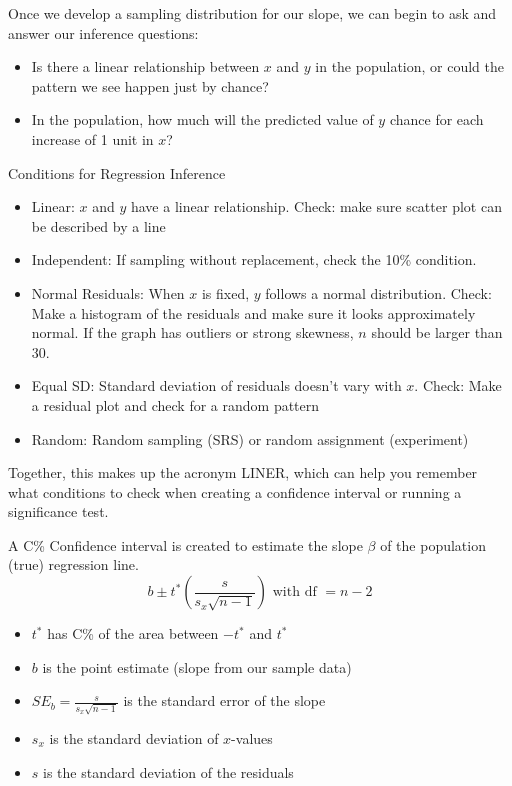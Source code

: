\documentclass[../stats.tex]{subfiles}
\begin{document}
Once we develop a sampling distribution for our slope, we can begin to ask and answer our inference questions:
\begin{itemize}
    \item Is there a linear relationship between $x$ and $y$ in the population, or could the pattern we see happen just by chance?
    \item In the population, how much will the predicted value of $y$ chance for each increase of 1 unit in $x$?
\end{itemize}

Conditions for Regression Inference 
\begin{itemize}
    \item Linear: $x$ and $y$ have a linear relationship. Check: make sure scatter plot can be described by a line 
    \item Independent: If sampling without replacement, check the 10\% condition.
    \item Normal Residuals: When $x$ is fixed, $y$ follows a normal distribution. Check: Make a histogram of the residuals and make sure it looks approximately normal. If the graph has outliers or strong skewness, $n$ should be larger than 30.
    \item Equal SD: Standard deviation of residuals doesn't vary with $x$. Check: Make a residual plot and check for a random pattern 
    \item Random: Random sampling (SRS) or random assignment (experiment)
\end{itemize}

Together, this makes up the acronym LINER, which can help you remember what conditions to check when creating a confidence interval or running a significance test.

A C\% Confidence interval is created to estimate the slope $\beta$ of the population (true) regression line.
\[ b\pm t^*\left(\frac{s}{s_x\sqrt{n-1}}\right) \text{ with df } = n-2\]
\begin{itemize}
    \item $t^*$ has C\% of the area between $-t^*$ and $t^*$
    \item $b$ is the point estimate (slope from our sample data)
    \item $SE_b = \frac{s}{s_x\sqrt{n-1}}$ is the standard error of the slope 
    \item $s_x$ is the standard deviation of $x$-values 
    \item $s$ is the standard deviation of the residuals
\end{itemize}
\end{document}
